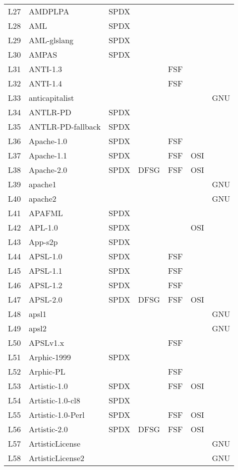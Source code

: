 \begin{longtable}[h]{m{2cm} | m{7cm} | c | c | c | c | c}
  L27 & AMDPLPA & SPDX &  &  &  &  \\
  L28 & AML & SPDX &  &  &  &  \\
  L29 & AML-glslang & SPDX &  &  &  &  \\
  L30 & AMPAS & SPDX &  &  &  &  \\
  L31 & ANTI-1.3 &  &  & FSF &  &  \\
  L32 & ANTI-1.4 &  &  & FSF &  &  \\
  L33 & anticapitalist &  &  &  &  & GNU \\
  L34 & ANTLR-PD & SPDX &  &  &  &  \\
  L35 & ANTLR-PD-fallback & SPDX &  &  &  &  \\
  L36 & Apache-1.0 & SPDX &  & FSF &  &  \\
  L37 & Apache-1.1 & SPDX &  & FSF & OSI &  \\
  L38 & Apache-2.0 & SPDX & DFSG & FSF & OSI &  \\
  L39 & apache1 &  &  &  &  & GNU \\
  L40 & apache2 &  &  &  &  & GNU \\
  L41 & APAFML & SPDX &  &  &  &  \\
  L42 & APL-1.0 & SPDX &  &  & OSI &  \\
  L43 & App-s2p & SPDX &  &  &  &  \\
  L44 & APSL-1.0 & SPDX &  & FSF &  &  \\
  L45 & APSL-1.1 & SPDX &  & FSF &  &  \\
  L46 & APSL-1.2 & SPDX &  & FSF &  &  \\
  L47 & APSL-2.0 & SPDX & DFSG & FSF & OSI &  \\
  L48 & apsl1 &  &  &  &  & GNU \\
  L49 & apsl2 &  &  &  &  & GNU \\
  L50 & APSLv1.x &  &  & FSF &  &  \\
  L51 & Arphic-1999 & SPDX &  &  &  &  \\
  L52 & Arphic-PL &  &  & FSF &  &  \\
  L53 & Artistic-1.0 & SPDX &  & FSF & OSI &  \\
  L54 & Artistic-1.0-cl8 & SPDX &  &  &  &  \\
  L55 & Artistic-1.0-Perl & SPDX &  & FSF & OSI &  \\
  L56 & Artistic-2.0 & SPDX & DFSG & FSF & OSI &  \\
  L57 & ArtisticLicense &  &  &  &  & GNU \\
  L58 & ArtisticLicense2 &  &  &  &  & GNU \\

\end{longtable}
